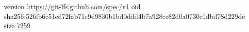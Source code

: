 version https://git-lfs.github.com/spec/v1
oid sha256:526fb6c51ed72fab71c9d9830b1bd0ddd4b7a928cc82d0a0730c1dbd78d229de
size 7259
